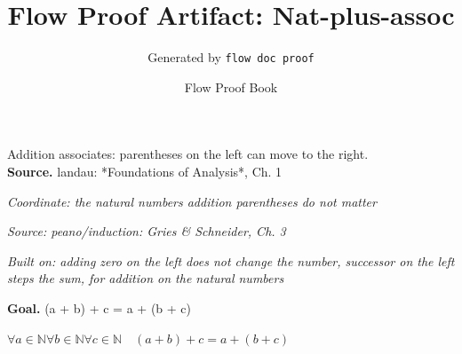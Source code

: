 \documentclass[11pt]{article}
\title{Flow Proof Artifact: Nat-plus-assoc}
\author{Generated by \texttt{flow doc proof}}
\date{Flow Proof Book}
\theoremstyle{definition}
\begin{document}
\maketitle
Addition associates: parentheses on the left can move to the right.\\[0.5em]
\textbf{Source.} landau: *Foundations of Analysis*, Ch. 1\\[0.5em]
\bigskip
{}\par
\smallskip\noindent\textit{Coordinate: the natural numbers \cdot addition \cdot parentheses do not matter}\par
\smallskip\noindent\textit{Source: peano/induction: Gries \& Schneider, Ch. 3}\par
\smallskip\noindent\textit{Built on: adding zero on the left does not change the number, successor on the left steps the sum, for addition on the natural numbers}\par
\medskip
\noindent\textbf{Goal.} (a + b) + c = a + (b + c)\par
\noindent$\displaystyle \forall a \in \mathbb{N} \forall b \in \mathbb{N} \forall c \in \mathbb{N}\quad (a + b) + c = a + (b + c)$\par
\medskip
\noindent
\end{document}
